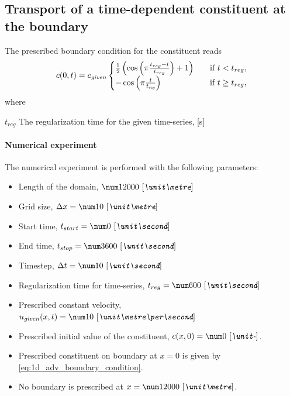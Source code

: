\subsection{Transport of a time-dependent constituent at the boundary}
\label{sec:numerical_experiment_1d_adv_constant_boundary}
The prescribed boundary condition for the constituent reads
\begin{align}
    c(0,t) = c_{\it given}
    \begin{cases}
        \frac{1}{2} \left(\cos\left(\pi \frac{t_{reg} - t}{t_{reg}}\right) + 1  \right) &\quad \text{if } t < t_{reg},
        \\
        -\cos\left(\pi \frac{t}{t_{\it reg}} \right) &\quad \text{if } t \geq t_{reg},
    \end{cases}
    \label{eq:1d_adv_sine_boundary_condition}
\end{align}
where
\begin{symbollist}
    \item[$t_{reg}$] The regularization time for the given time-series, [\si{\second}]
\end{symbollist}
\paragraph*{Numerical experiment}
The numerical experiment is performed with the following parameters:
\begin{itemize}
    \item Length of the domain, $\bqty{12000}{\metre}$
    \item Grid size, $\Dx = \bqty{10}{\metre}$
    \item Start time, $t_{start} = \bqty{0}{\second}$
    \item End time, $t_{stop} = \bqty{3600}{\second}$
    \item Timestep, $\Dt = \bqty{10}{\second}$
    \item Regularization time for time-series, $t_{reg} = \bqty{600}{\second}$
    \item Prescribed constant velocity, $u_{\it given}(x,t) = \bqty{10}{\metre\per\second}$
    \item Prescribed initial value of the constituent, $c(x,0)= \bqty{0}{-}$.
    \item Prescribed constituent on boundary at $x=0$ is given by \autoref{eq:1d_adv_boundary_condition}.
    \item No boundary is prescribed at $x=\bqty{12000}{\metre}$.
\end{itemize}
